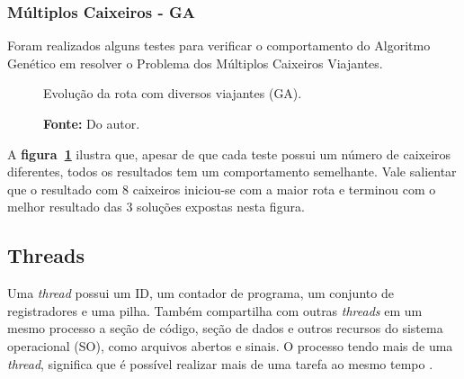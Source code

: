 \documentclass[12pt,openright,a4paper,twoside]{tcc}
\begin{document}
        \newpage
		\subsubsection{Múltiplos Caixeiros - GA}

		Foram realizados alguns testes para verificar o comportamento do Algoritmo Genético em resolver o Problema dos Múltiplos Caixeiros Viajantes.

		\begin{figure}[h]
			\centering
            \caption{Evolução da rota com diversos viajantes (GA).}
			\caption*{\textbf{Fonte:} Do autor.}
			\label{figgaga}
		\end{figure}

		A \textbf{figura~\ref{figgaga}} ilustra que, apesar de que cada teste possui um número de caixeiros diferentes, todos os resultados tem um comportamento semelhante. Vale salientar que o resultado com 8 caixeiros iniciou-se com a maior rota e terminou com o melhor resultado das 3 soluções expostas nesta figura.

		\subsection{Threads}

		Uma \textit{thread} possui um ID, um contador de programa, um conjunto de registradores e uma pilha. Também compartilha com outras \textit{threads} em um mesmo processo a seção de código, seção de dados e outros recursos do sistema operacional (SO), como arquivos abertos e sinais. 
		O processo tendo mais de uma \textit{thread}, significa que é possível realizar mais de uma tarefa ao mesmo tempo \cite{THREAD}.		
		\newpage
\end{document}
